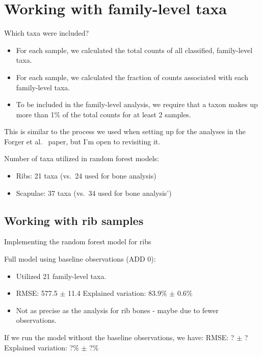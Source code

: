 \documentclass{beamer}
\begin{document}
\section[Family-level taxa]{Working with family-level taxa}

\begin{frame}{Which taxa were included?}

  \begin{itemize}
  \item For each sample, we calculated the total counts of all classified,
family-level taxa.
  \item For each sample, we calculated the fraction of counts
associated with each family-level taxa. 
  \item To be included in the family-level analysis, we require that a taxon
  makes up more than 1\% of the total counts for at least 2 samples.
  \end{itemize}

  \vspace{0.1in}

  \noindent This is similar to the process we used when setting up for the
analyses in the Forger et al.~ paper, but I'm open to revisiting it.

  \vspace{0.1in}

  \noindent Number of taxa utilized in random forest models:
  \begin{itemize}
    \item Ribs: 21 taxa (vs.\ 24 used for bone analysis)
    \item Scapulae: 37 taxa (vs.\ 34 used for bone analysis')
  \end{itemize}


\end{frame}



\subsection[Ribs]{Working with rib samples}

\begin{frame}{Implementing the random forest model for ribs}

Full model using baseline observations (ADD 0):
\begin{itemize}
\item Utilized 21 family-level taxa.
\item RMSE: 577.5 $\pm$  11.4 \hspace{0.05in}  Explained variation: 83.9\%
$\pm$ 0.6\%
\item Not as precise as the analysis for rib bones - maybe due to fewer
observations.
\end{itemize}

\vspace{0.1in}

If we run the model without the baseline observations, we have:
\noindent RMSE: ? $\pm$  ? \hspace{0.05in}  Explained variation: ?\%
$\pm$ ?\%

\end{frame}
\end{document}
